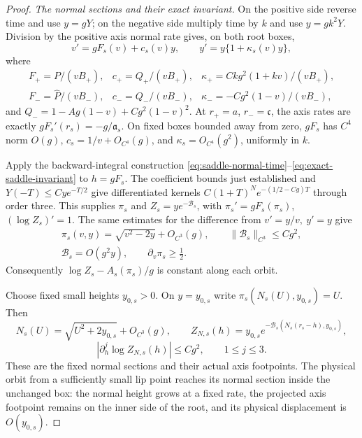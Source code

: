 \begin{proof}
\emph{The normal sections and their exact invariant.}
On the positive side reverse time and use \(y=gY\); on the
negative side multiply time by \(k\) and use \(y=gk^2Y\).
Division by the positive axis normal rate gives, on both root boxes,
\begin{equation}
 v'=gF_s(v)+c_s(v)y,\qquad y'=y\{1+\kappa_s(v)y\},
 \label{deg:joint-root-local-normal-field}
\end{equation}
where
\[
 \begin{array}{lll}
 F_+=P/(vB_+),&
 c_+=Q_+/(vB_+),&
 \kappa_+=Ckg^2(1+kv)/(vB_+),\\
 F_-=\widehat P/(vB_-),&
 c_-=Q_-/(vB_-),&
 \kappa_-=-Cg^2(1-v)/(vB_-),
 \end{array}
\]
and \(Q_-=1-Ag(1-v)+Cg^2(1-v)^2\).
At \(r_+=a\), \(r_-=\mathfrak c\), the axis rates are exactly
\(gF_s'(r_s)=-g/\mathfrak a_s\).
On fixed boxes bounded away from zero, \(gF_s\) has \(C^4\) norm
\(O(g)\), \(c_s=1/v+O_{C^4}(g)\), and
\(\kappa_s=O_{C^4}(g^2)\), uniformly in \(k\).

Apply the backward-integral construction
\eqref{eq:saddle-normal-time}--\eqref{eq:exact-saddle-invariant}
to \(h=gF_s\). The coefficient bounds just established and
\(Y(-T)\le Cy e^{-T/2}\) give differentiated kernels
\(C(1+T)^Ne^{-(1/2-Cg)T}\) through order three.
This supplies \(\pi_s\) and \(Z_s=ye^{-\mathcal B_s}\), with
\(\pi_s'=gF_s(\pi_s)\), \((\log Z_s)'=1\).
The same estimates for the difference from
\(v'=y/v,\ y'=y\) give
\begin{equation}
 \begin{gathered}
 \pi_s(v,y)=\sqrt{v^2-2y}+O_{C^3}(g),\qquad
 \|\mathcal B_s\|_{C^3}\le Cg^2,\\
 \mathcal B_s=O(g^2y),\qquad \partial_v\pi_s\ge\tfrac12.
 \end{gathered}
 \label{deg:joint-root-local-projection}
\end{equation}
Consequently \(\log Z_s-A_s(\pi_s)/g\) is constant along each orbit.

Choose fixed small heights \(y_{0,s}>0\). On \(y=y_{0,s}\) write
\(\pi_s(N_s(U),y_{0,s})=U\). Then
\[
 N_s(U)=\sqrt{U^2+2y_{0,s}}+O_{C^3}(g),\qquad
 Z_{N,s}(h)=y_{0,s}e^{-\mathcal B_s(N_s(r_s-h),y_{0,s})},
\]
\[
 |\partial_h^j\log Z_{N,s}(h)|\le Cg^2,\qquad 1\le j\le3.
\]
These are the fixed normal sections and their actual axis footpoints.
The physical orbit from a sufficiently small lip point reaches its
normal section inside the unchanged box: the normal height grows
at a fixed rate, the projected axis footpoint remains on the inner
side of the root, and its physical displacement is \(O(y_{0,s})\).


\end{proof}
